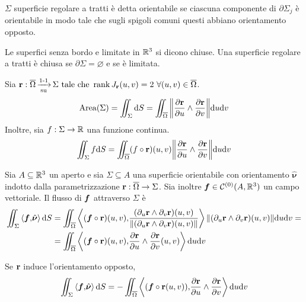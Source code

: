 \begin{definition}
	$\Sigma$ superficie regolare a tratti è detta orientabile se ciascuna componente di $\partial \Sigma_j$ è orientabile in modo tale che sugli spigoli comuni questi abbiano orientamento opposto.
\end{definition}

\begin{definition}
	Le superfici senza bordo e limitate in $\mathbb{R}^3$ si dicono chiuse. Una superficie regolare a tratti è chiusa se $\partial \Sigma = \varnothing$ e se è limitata.
\end{definition}

\begin{definition}
	Sia $\vb{r}:\overline{\Omega} \operatorname{\xrightarrow[\operatorname{su}]{\operatorname{1-1}}} \Sigma \text{ tale che } \rank J_{\vb{r}}(u,v) = 2 \ \forall (u,v) \in \overline{\Omega}$.
	$$
		\operatorname{Area} (\Sigma) = \iint_\Sigma \dd S = \iint_{\overline{\Omega}} \norm{\frac{\partial \vb{r}}{\partial u}\wedge \frac{\partial \vb{r}}{\partial v}}\dd u \dd v
	$$
	Inoltre, sia $f: \Sigma \to \mathbb{R}$ una funzione continua.
	$$
		\iint_\Sigma f \dd S = \iint_{\overline{\Omega}}(f\circ\vb{r})(u,v)\norm{\frac{\partial \vb{r}}{\partial u}\wedge \frac{\partial \vb{r}}{\partial v}}\dd u \dd v
	$$
\end{definition}

\begin{definition}
	[Flusso]
	Sia $A\subseteq \mathbb{R}^3$ un aperto e sia $\Sigma \subseteq A$ una superficie orientabile con orientamento $\hat{\bm \nu}$ indotto dalla parametrizzazione $\vb{r}:\overline{\Omega}\to\Sigma$. Sia inoltre $\bm f \in \mathcal{C}^{(0)}(A,\mathbb{R}^3)$ un campo vettoriale. Il flusso di $\bm f$ attraverso $\Sigma$ è
	\begin{align*}
		\iint_\Sigma \ip{\vecf}{\hat{\bm\nu}}\dd S 
		&=\iint_{\overline{\Omega}}\innerproduct{(\vecf\circ\vb{r})(u,v)}{\frac{(\partial_u\vb{r}\wedge\partial_v\vb{r})(u,v)}{\norm{(\partial_u\vb{r}\wedge\partial_v\vb{r})(u,v)}}}\norm{(\partial_u\vb{r}\wedge\partial_v\vb{r})(u,v)}\dd u \dd v=\\
		&= \iint_{\overline{\Omega}}\ip{(\vecf\circ\vb{r})(u,v)}{\frac{\partial \vb{r}}{\partial u} \wedge \frac{\partial \vb{r}}{\partial v}(u,v)}\dd u \dd v\\
	\end{align*}
\end{definition}

\begin{remark}
	Se $\vb{r}$ induce l'orientamento opposto,
	$$
		\iint_\Sigma \ip{\vecf}{\hat{\bm\nu}}\dd S = -\iint_{\overline{\Omega}}\ip{(\vecf\circ\vb{r}(u,v))}{\frac{\partial \vb{r}}{\partial u}\wedge \frac{\partial \vb{r}}{\partial v}}\dd u \dd v
	$$
\end{remark}

